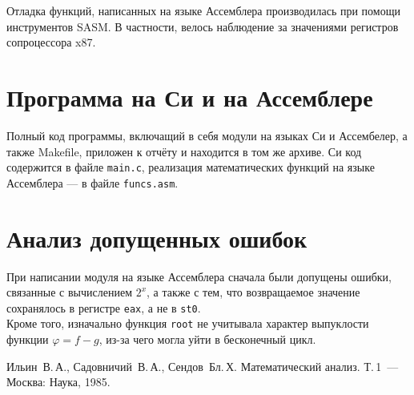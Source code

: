 \documentclass[a4paper,12pt,titlepage,finall]{article}
\begin{document}
Отладка функций, написанных на языке Ассемблера производилась при помощи инструментов SASM. В частности, велось наблюдение за значениями регистров сопроцессора x87.

\newpage

\section{Программа на Си и на Ассемблере}

Полный код программы, включащий в себя модули на языках Си и Ассембелер, а также Makefile, приложен к отчёту и находится в том же архиве. Си код содержится в файле \texttt{main.c}, реализация математических функций на языке Ассемблера --- в файле \texttt{funcs.asm}.

\newpage

\section{Анализ допущенных ошибок}

При написании модуля на языке Ассемблера сначала были допущены ошибки, связанные с вычислением $2^x$, а также с тем, что возвращаемое значение сохранялось в регистре \texttt{eax}, а не в \texttt{st0}.\\

Кроме того, изначально функция \texttt{root} не учитывала характер выпуклости функции $\varphi = f - g$, из-за чего могла уйти в бесконечный цикл.

\newpage

\begin{raggedright}
\begin{thebibliography}{99}
 Ильин~В.\,А., Садовничий~В.\,А., Сендов~Бл.\,Х. Математический анализ. Т.\,1~---
    Москва: Наука, 1985.
\end{thebibliography}
\end{raggedright}
\end{document}
